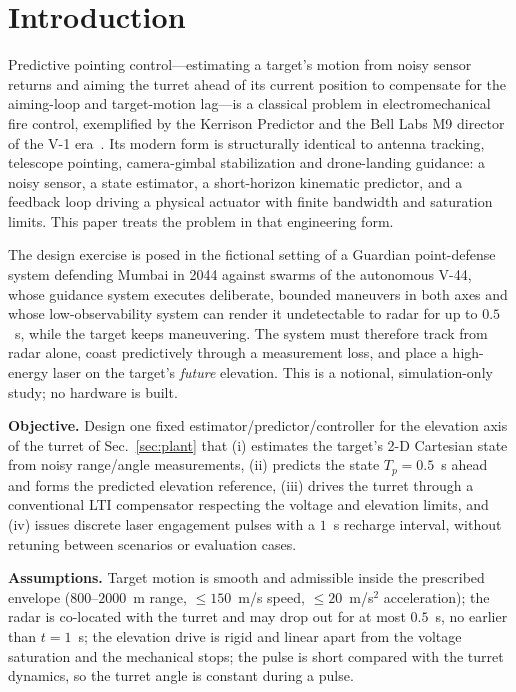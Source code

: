 \documentclass[conference]{IEEEtran}
\begin{document}
\section{Introduction}
Predictive pointing control---estimating a target's motion from noisy sensor returns and aiming the turret ahead of its current position to compensate for the aiming-loop and target-motion lag---is a classical problem in electromechanical fire control, exemplified by the Kerrison Predictor and the Bell Labs M9 director of the V-1 era~\cite{mindell}. Its modern form is structurally identical to antenna tracking, telescope pointing, camera-gimbal stabilization and drone-landing guidance: a noisy sensor, a state estimator, a short-horizon kinematic predictor, and a feedback loop driving a physical actuator with finite bandwidth and saturation limits. This paper treats the problem in that engineering form.

The design exercise is posed in the fictional setting of a Guardian point-defense system defending Mumbai in 2044 against swarms of the autonomous V-44, whose guidance system executes deliberate, bounded maneuvers in both axes and whose low-observability system can render it undetectable to radar for up to $0.5$~s, while the target keeps maneuvering. The system must therefore track from radar alone, coast predictively through a measurement loss, and place a high-energy laser on the target's \emph{future} elevation. This is a notional, simulation-only study; no hardware is built.

\textbf{Objective.} Design one fixed estimator/predictor/controller for the elevation axis of the turret of Sec.~\ref{sec:plant} that (i) estimates the target's 2-D Cartesian state from noisy range/angle measurements, (ii) predicts the state $T_p=0.5$~s ahead and forms the predicted elevation reference, (iii) drives the turret through a conventional LTI compensator respecting the voltage and elevation limits, and (iv) issues discrete laser engagement pulses with a $1$~s recharge interval, without retuning between scenarios or evaluation cases.

\textbf{Assumptions.} Target motion is smooth and admissible inside the prescribed envelope ($800$--$2000$~m range, $\le150$~m/s speed, $\le20$~m/s$^2$ acceleration); the radar is co-located with the turret and may drop out for at most $0.5$~s, no earlier than $t=1$~s; the elevation drive is rigid and linear apart from the voltage saturation and the mechanical stops; the pulse is short compared with the turret dynamics, so the turret angle is constant during a pulse.
\end{document}

